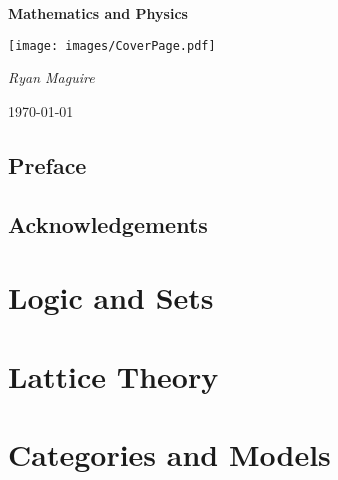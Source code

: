 \documentclass{book}                                                           %
\newcommand*{\TOPPATH}{books}
\newcommand*{\PATH}{\TOPPATH/}
\newcounter{endpage}
\begin{document}
    \pagecolor{CoverPage}
    \begin{titlepage}
        \centering
        {\LARGE\bfseries{Mathematics and Physics}\par}
        \vspace{3.5cm}
        \texttt{[image: images/CoverPage.pdf]}
        \par\vspace{3cm}
        {\Large\itshape{Ryan Maguire}\par}
        \vfill
        {\large\today\par}
    \end{titlepage}
    \nopagecolor
    \tableofcontents
    \listoffigures
    \listoftables
    \clearpage
    \chapter*{Preface}
        
    \clearpage
    \chapter*{Acknowledgements}
        
    \clearpage

        \label{book:Foundations}
        \renewcommand{\PATH}{\TOPPATH/Foundations}
        \part{Logic and Sets}
            
        \part{Lattice Theory}
            
        \part{Categories and Models}
            
    \clearpage

    \setcounter{endpage}{\thepage}
        \label{book:Algebra}%
        \renewcommand{\PATH}{\TOPPATH/Algebra}
        \setcounter{page}{\value{endpage}}
\end{document}
